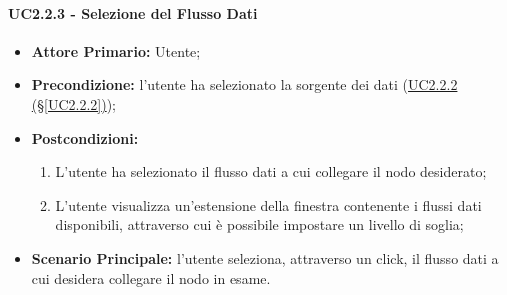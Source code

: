 \paragraph{UC2.2.3 - Selezione del Flusso Dati}\label{UC2.2.3}
\begin{itemize}
\item \textbf{Attore Primario:} Utente;
\item \textbf{Precondizione:} l'utente ha selezionato la sorgente dei dati (\hyperref[UC2.2.2]{UC2.2.2 (§\ref*{UC2.2.2})});
\item \textbf{Postcondizioni:}
	\begin{enumerate}
	\item L'utente ha selezionato il flusso dati a cui collegare il nodo desiderato;
	\item L'utente visualizza un'estensione della finestra contenente i flussi dati disponibili, attraverso cui è 					possibile impostare un livello di soglia;
	\end{enumerate}
\item \textbf{Scenario Principale:} l'utente seleziona, attraverso un click, il flusso dati a cui desidera 						collegare il nodo in esame.
\end{itemize}


